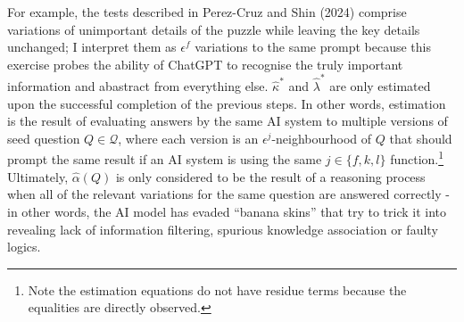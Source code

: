 \documentclass[
]{article}
\begin{document}
For example, the tests described in Perez-Cruz and Shin (2024) comprise
variations of unimportant details of the puzzle while leaving the key
details unchanged; I interpret them as \(\epsilon^f\) variations to the
same prompt because this exercise probes the ability of ChatGPT to
recognise the truly important information and abastract from everything
else. \(\hat{\kappa}^*\) and \(\hat{\lambda}^*\) are only estimated upon
the successful completion of the previous steps. In other words,
estimation is the result of evaluating answers by the same AI system to
multiple versions of seed question \(Q \in \mathcal{Q}\), where each
version is an \(\epsilon^j\)-neighbourhood of \(Q\) that should prompt
the same result if an AI system is using the same \(j \in \{f, k, l\}\)
function.\footnote{Note the estimation equations do not have residue
  terms because the equalities are directly observed.} Ultimately,
\(\hat{\alpha}(Q)\) is only considered to be the result of a reasoning
process when all of the relevant variations for the same question are
answered correctly - in other words, the AI model has evaded ``banana
skins'' that try to trick it into revealing lack of information
filtering, spurious knowledge association or faulty logics.
\end{document}
